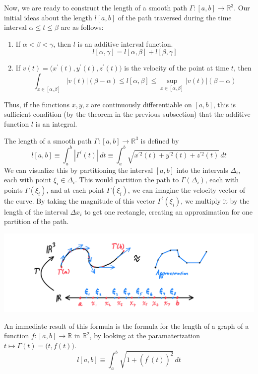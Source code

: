     Now, we are ready to construct the length of a smooth path $\Gamma: [a, b] \longrightarrow \mathbb{R}^3$. Our initial ideas about the length $l[a, b]$ of the path traversed during the time interval $\alpha \leq t \leq \beta$ are as follows: 
    \begin{enumerate}
      \item If $\alpha < \beta < \gamma$, then $l$ is an additive interval function.
      \[l[\alpha, \gamma] = l[\alpha, \beta] + l[\beta, \gamma]\]
      \item If $v(t) = \big( x^\prime (t), y^\prime (t), z^\prime (t)\big)$ is the velocity of the point at time $t$, then 
      \[\int_{x \in [\alpha, \beta]} |v(t)| (\beta - \alpha) \leq l[\alpha, \beta] \leq \sup_{x \in [\alpha, \beta]} |v(t)| (\beta - \alpha)\]
    \end{enumerate}
    Thus, if the functions $x, y, z$ are continuously differentiable on $[a, b]$, this is sufficient condition (by the theorem in the previous subsection) that the additive function $l$ is an integral.

    \begin{definition}
      The length of a smooth path $\Gamma: [a, b] \longrightarrow \mathbb{R}^3$ is defined by 
      \[l[a, b] \equiv \int_a^b |\Gamma^\prime (t)|\,dt \equiv \int_a^b \sqrt{x^{\prime 2} (t) + y^{\prime 2} (t) + z^{\prime 2} (t)}\, dt\]
      We can visualize this by partitioning the interval $[a, b]$ into the intervals $\Delta_i$, each with point $\xi_i \in \Delta_i$. This would partition the path to $\Gamma(\Delta_i)$, each with points $\Gamma(\xi_i)$, and at each point $\Gamma(\xi_i)$, we can imagine the velocity vector of the curve. By taking the magnitude of this vector $\Gamma^\prime (\xi_i)$, we multiply it by the length of the interval $\Delta x_i$ to get one rectangle, creating an approximation for one partition of the path. 
      \begin{center}
          \includegraphics[scale=0.25]{img/Arc_Length_Integral.PNG}
      \end{center}
      An immediate result of this formula is the formula for the length of a graph of a function $f: [a, b] \longrightarrow \mathbb{R}$ in $\mathbb{R}^2$, by looking at the paramaterization $t \mapsto \Gamma(t) = \big(t, f(t)\big)$. 
      \[l[a,b] \equiv \int_a^b \sqrt{1 + (f^\prime (t))^2}\,dt\]
    \end{definition}

